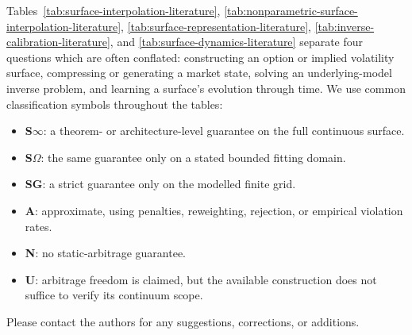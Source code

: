 Tables~\ref{tab:surface-interpolation-literature},
\ref{tab:nonparametric-surface-interpolation-literature},
\ref{tab:surface-representation-literature},
\ref{tab:inverse-calibration-literature}, and
\ref{tab:surface-dynamics-literature} separate four questions which are often
conflated: constructing an option or implied volatility surface, compressing or generating a
market state, solving an underlying-model inverse problem, and learning a
surface's evolution through time.  We use common classification
symbols throughout the tables:
\begin{itemize}[leftmargin=*,nosep]
  \item \textbf{S$\infty$}: a theorem- or architecture-level guarantee on the
        full continuous surface.
  \item \textbf{S$\Omega$}: the same guarantee only on a stated bounded fitting
        domain.
  \item \textbf{SG}: a strict guarantee only on the modelled finite grid.
  \item \textbf{A}: approximate, using penalties, reweighting, rejection, or
        empirical violation rates.
  \item \textbf{N}: no static-arbitrage guarantee.
  \item \textbf{U}: arbitrage freedom is claimed, but the available construction
        does not suffice to verify its continuum scope.
\end{itemize}
Please contact the authors for any suggestions, corrections, or additions.

\newcommand{\auditnew}[1]{#1}

